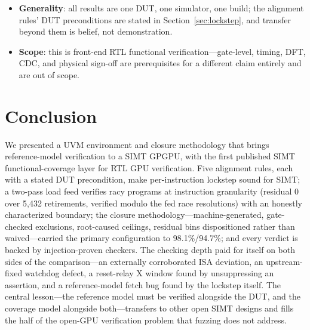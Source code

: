 \documentclass[conference]{IEEEtran}
\newcommand{\code}[1]{\texttt{\detokenize{#1}}}
\begin{document}
\begin{itemize}
	      discovery that instruction-class encodings alias (\code{4'b1011} is
	      both a zero-conditional op and \code{EBREAK}); per-mnemonic claims use
	      only post-remediation measurements.
	\item \textbf{Generality}: all results are one DUT, one simulator, one
	      build; the alignment rules' DUT preconditions are stated in
	      Section~\ref{sec:lockstep}, and transfer beyond them is belief, not
	      demonstration.
	\item \textbf{Scope}: this is front-end RTL functional
	      verification---gate-level, timing, DFT, CDC, and physical sign-off are
	      prerequisites for a different claim entirely and are out of scope.
\end{itemize}

\section{Conclusion}
\label{sec:conclusion}
We presented a UVM environment and closure methodology that brings
reference-model verification
to a SIMT GPGPU, with the first published SIMT functional-coverage
layer for RTL GPU verification. Five alignment rules, each with a
stated DUT precondition, make
per-instruction lockstep sound for SIMT; a two-pass load feed verifies
racy programs at instruction granularity (residual 0 over 5{,}432
retirements, verified modulo the fed race resolutions) with an honestly
characterized boundary; the closure methodology---machine-generated,
gate-checked exclusions, root-caused ceilings, residual bins
dispositioned rather than waived---carried the primary configuration
to 98.1\%/94.7\%; and
every verdict is backed by injection-proven checkers. The checking
depth paid for itself on both sides of the comparison---an externally
corroborated ISA deviation, an upstream-fixed watchdog defect, a
reset-relay X window found by unsuppressing an assertion, and a
reference-model fetch bug found by the lockstep itself. The central
lesson---the reference model must be verified alongside the DUT, and
the coverage model alongside both---transfers to other open SIMT
designs and fills the half of the open-GPU verification problem that
fuzzing does not address.
\end{document}
